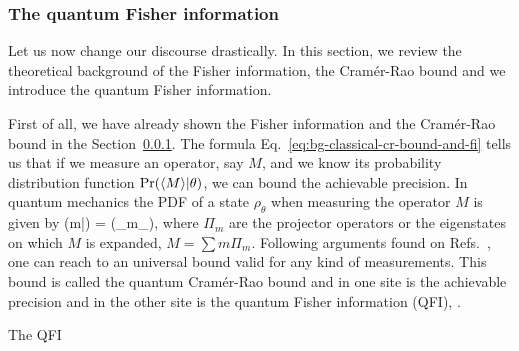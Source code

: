 \subsubsection{The quantum Fisher information}

Let us now change our discourse drastically.
In this section, we review the theoretical background of the Fisher information, the Cram\'er-Rao bound and we introduce the quantum Fisher information.

First of all, we have already shown the Fisher information and the Cram\'er-Rao bound in the Section~\ref{}.
The formula Eq.~\eqref{eq:bg-classical-cr-bound-and-fi} tells us that if we measure an operator, say $M$, and we know its probability distribution function $\text{Pr}(\langle M \rangle|\theta)$, we can bound the achievable precision.
In quantum mechanics the PDF of a state $\rho_\theta$ when measuring the operator $M$ is given by
\be
  \prob(m|\theta) = \tr({\Pi_{m}\rho_\theta}),
\ee
where $\Pi_{m}$ are the projector operators or the eigenstates on which $M$ is expanded, $M = \sum m \Pi_m$.
Following arguments found on Refs.~\citep{Paris2009, }, one can reach to an universal bound valid for any kind of measurements.
This bound is called the quantum Cram\'er-Rao bound and in one site is the achievable precision and in the other site is the quantum Fisher information (QFI),
\be
  \varinv{\theta} \leq \qfi[\rho,J_z].
\ee


\be
  \label{eq:bg-pezze-bound}
  \qfi[\rho,J_z] \geq {}
\ee

The QFI
